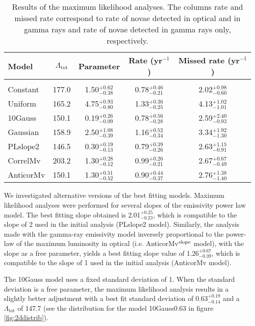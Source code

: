 \documentclass{aa} %
\newcommand{\tot}{\textrm{tot} }
\begin{document}
\begin{table*}[!t]
\caption{Results of the maximum likelihood analyses. The columns rate and missed rate correspond to rate of novae detected in optical and in gamma rays and rate of novae detected in gamma rays only, respectively.}
\centering
\begin{tabular}{lcccc}
\hline
\hline
Model       & $\Lambda_{\tot}$ & Parameter                        & Rate (yr$^{-1}$)              & Missed rate (yr$^{-1}$) \\
\hline\\
Constant & 177.0 & 1.50$^{+0.62}_{-0.38}$ & 0.78$^{+0.46}_{-0.21}$ & 2.02$^{+0.98}_{-0.60}$ \\
Uniform & 165.2 & 4.75$^{+0.93}_{-0.80}$ & 1.33$^{+0.36}_{-0.25}$ & 4.13$^{+1.02}_{-1.01}$ \\
10Gauss & 150.1 & 0.19$^{+0.26}_{-0.09}$ & 0.78$^{+0.56}_{-0.28}$ & 2.59$^{+2.40}_{-0.93}$ \\
Gaussian & 158.9 & 2.50$^{+1.08}_{-0.39}$ & 1.16$^{+0.52}_{-0.34}$ & 3.34$^{+1.92}_{-1.30}$ \\
PLslope2 & 146.5 & 0.30$^{+0.19}_{-0.13}$ & 0.79$^{+0.39}_{-0.26}$ & 2.63$^{+1.15}_{-0.91}$ \\ 
CorrelMv & 203.2 & 1.30$^{+0.28}_{-0.12}$ & 0.99$^{+0.26}_{-0.21}$ & 2.67$^{+0.67}_{-0.49}$ \\
AnticorMv & 150.1 & 1.30$^{+0.51}_{-0.52}$ & 0.90$^{+0.44}_{-0.37}$ & 2.76$^{+1.38}_{-1.40}$ \\
\hline
\end{tabular}
\label{Tab:MLRmodels}
\end{table*}


We investigated alternative versions of the best fitting models. Maximum likelihood analyses were performed for several slopes of the emissivity power law model. The best fitting slope obtained is 2.01$^{+0.25}_{-0.23}$, which is compatible to the slope of 2 used in the initial analysis (PLslope2 model). Similarly, the analysis made with the gamma-ray emissivity model inversely proportional to the power-law of the maximum luminosity in optical (i.e. AnticorMv$^{\rm slope}$ model), with the slope as a free parameter, yields a best fitting slope value of 1.26$^{+0.67}_{-0.39}$, which is compatible to the slope of 1 used in the initial analysis (AnticorMv model).

The 10Gauss model uses a fixed standard deviation of 1. When the standard deviation is a free parameter, the maximum likelihood analysis results in a slightly better adjustment with a best fit standard deviation of 0.63$^{+0.19}_{-0.14}$ and a $\Lambda_{\tot}$ of 147.7 (see the distribution for the model 10Gauss0.63 in figure \ref{fig:2ddistrib}).
\end{document}
